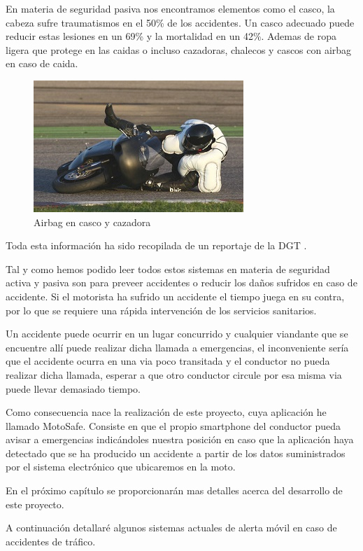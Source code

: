 		En materia de seguridad pasiva nos encontramos elementos como el casco, la cabeza sufre traumatismos en el 50\% de los accidentes. Un casco adecuado puede reducir estas lesiones en un 69\% y la mortalidad en un 42\%. Ademas de ropa ligera que protege en las caidas o incluso cazadoras, chalecos y cascos con airbag en caso de caida.
		
		\begin{figure}[h]
			\centering
			\includegraphics{imagenes/airbag.jpg}
			\caption{Airbag en casco y cazadora}
			\label{contexto:figura}
		\end{figure}
		
		Toda esta información ha sido recopilada de un reportaje de la DGT \cite{Dgt}.
		
		Tal y como hemos podido leer todos estos sistemas en materia de seguridad activa y pasiva son para preveer accidentes o reducir los da\~nos sufridos en caso de accidente. Si el motorista ha sufrido un accidente el tiempo juega en su contra, por lo que se requiere una rápida intervención de los servicios sanitarios. 
		
		Un accidente puede ocurrir en un lugar concurrido y cualquier viandante que se encuentre allí puede realizar dicha llamada a emergencias, el inconveniente sería que el accidente ocurra en una via poco transitada y el conductor no pueda realizar dicha llamada, esperar a que otro conductor circule por esa misma via puede llevar demasiado tiempo.
		
		Como consecuencia nace la realización de este proyecto, cuya aplicación he llamado MotoSafe. Consiste en que el propio smartphone del conductor pueda avisar a emergencias indicándoles nuestra posición en caso que la aplicación haya detectado que se ha producido un accidente a partir de los datos suministrados por el sistema electrónico que ubicaremos en la moto.
		
		En el próximo capítulo se proporcionarán mas detalles acerca del desarrollo de este proyecto.
		
		A continuación detallaré algunos sistemas actuales de alerta móvil en caso de accidentes de tráfico.
		
